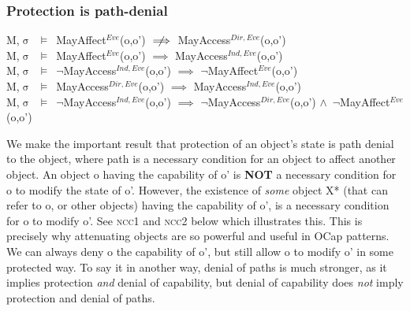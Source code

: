 \documentclass[a4paper,11pt, twoside,twocolumn]{article}
\newenvironment{logic}[1][]
{\begin{flushleft} \small }
{\end{flushleft}}
\newcommand{\loand}{$\land$}
\newcommand{\loimplies}{$\implies$}
\newcommand{\lonimplies}{$\centernot\implies$}
\newcommand{\losigma}{$\upsigma$}
\newcommand{\loturns} {$\vDash$}
\newcommand{\loneg}{$\boldsymbol \neg$}
\begin{document}
\subsubsection{Protection is path-denial}
\begin{logic}
M,\losigma\ \loturns\ MayAffect$^{Eve}$(o,o') \lonimplies 
MayAccess$^{Dir,Eve}$(o,o')\linebreak
\\
M,\losigma\ \loturns\ MayAffect$^{Eve}$(o,o') \loimplies 
MayAccess$^{Ind,Eve}$(o,o')\linebreak
\\
M,\losigma\ \loturns\ \loneg MayAccess$^{Ind,Eve}$(o,o') \loimplies 
\loneg MayAffect$^{Eve}$(o,o')\linebreak
\\
M,\losigma\ \loturns\ MayAccess$^{Dir,Eve}$(o,o') \loimplies 
MayAccess$^{Ind,Eve}$(o,o')\linebreak
\\
M,\losigma\ \loturns\ \loneg MayAccess$^{Ind,Eve}$(o,o') \loimplies 
\loneg MayAccess$^{Dir,Eve}$(o,o') \loand\ \loneg MayAffect$^{Eve}$(o,o')\linebreak
\end{logic}
We make the important result that protection of an object's state is path denial to the object, where path is a necessary condition for an object to affect another object. An object o having the capability of o' is \textbf{NOT} a necessary condition for o to modify the state of o'. However, the existence of \textit{some} object X* (that can refer to o, or other objects) having the capability of o', is a necessary condition for o to modify o'. See \textsc{ncc1} and \textsc{ncc2} below which illustrates this. This is precisely why attenuating objects are so powerful and useful in OCap patterns. We can always deny o the capability of o', but still allow o to modify o' in some protected way. To say it in another way, denial of paths is much stronger, as it implies protection \textit{and} denial of capability, but denial of capability does \textit{not} imply protection and denial of paths.\\
\end{document}
